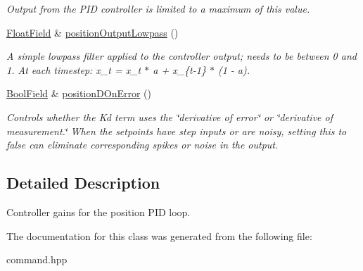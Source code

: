 \begin{DoxyCompactItemize}
\begin{DoxyCompactList}\small\item\em Output from the P\+ID controller is limited to a maximum of this value. \end{DoxyCompactList}\item 
\hyperlink{classhebi_1_1Command_1_1FloatField}{Float\+Field} \& \hyperlink{classhebi_1_1Command_1_1Settings_1_1Actuator_1_1PositionGains_a55a7aa7799b23c147d2ac1be01d27a18}{position\+Output\+Lowpass} ()\hypertarget{classhebi_1_1Command_1_1Settings_1_1Actuator_1_1PositionGains_a55a7aa7799b23c147d2ac1be01d27a18}{}\label{classhebi_1_1Command_1_1Settings_1_1Actuator_1_1PositionGains_a55a7aa7799b23c147d2ac1be01d27a18}

\begin{DoxyCompactList}\small\item\em A simple lowpass filter applied to the controller output; needs to be between 0 and 1. At each timestep\+: x\+\_\+t = x\+\_\+t $\ast$ a + x\+\_\+\{t-\/1\} $\ast$ (1 -\/ a). \end{DoxyCompactList}\item 
\hyperlink{classhebi_1_1Command_1_1BoolField}{Bool\+Field} \& \hyperlink{classhebi_1_1Command_1_1Settings_1_1Actuator_1_1PositionGains_af2e5fc61e4d8556424f1e6c87c737c91}{position\+D\+On\+Error} ()\hypertarget{classhebi_1_1Command_1_1Settings_1_1Actuator_1_1PositionGains_af2e5fc61e4d8556424f1e6c87c737c91}{}\label{classhebi_1_1Command_1_1Settings_1_1Actuator_1_1PositionGains_af2e5fc61e4d8556424f1e6c87c737c91}

\begin{DoxyCompactList}\small\item\em Controls whether the Kd term uses the \char`\"{}derivative of error\char`\"{} or \char`\"{}derivative of measurement.\char`\"{} When the setpoints have step inputs or are noisy, setting this to {\ttfamily false} can eliminate corresponding spikes or noise in the output. \end{DoxyCompactList}\end{DoxyCompactItemize}


\subsection{Detailed Description}
Controller gains for the position P\+ID loop. 

The documentation for this class was generated from the following file\+:\begin{DoxyCompactItemize}
\item 
command.\+hpp\end{DoxyCompactItemize}
